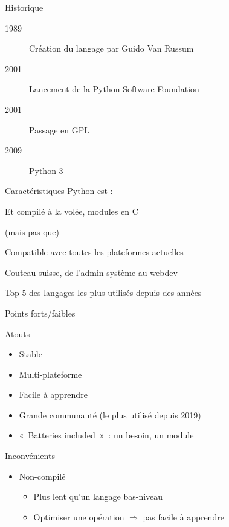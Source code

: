 \begin{frame}{Historique}
  \begin{description}
  \item[1989] Création du langage par Guido Van Russum
  \item[2001] Lancement de la Python Software Foundation
  \item[2001] Passage en GPL
  \item[2009] Python 3
  \end{description}
\end{frame}

\begin{frame}{Caractéristiques}
  Python est :
  \begin{description}[<+(1)->]
  \item[Interprété] Et compilé à la volée, modules en C
  \item[Orienté objet] (mais pas que)
  \item[Portable] Compatible  avec toutes les plateformes actuelles
  \item[Flexible] Couteau suisse, de l'admin système au webdev
  \item[Populaire] Top 5 des langages les plus utilisés depuis des années
  \end{description}
\end{frame}

\begin{frame}{Points forts/faibles}
  \begin{minipage}[l]{0.49\linewidth}
    Atouts
    \begin{itemize}
    \item Stable
    \item Multi-plateforme
    \item Facile à apprendre
    \item Grande communauté (le plus utilisé depuis 2019)
    \item « Batteries included » : un besoin, un module
    \end{itemize}
  \end{minipage}\hfill
  \begin{minipage}[l]{0.49\linewidth}
    Inconvénients
    \begin{itemize}
    \item Non-compilé
      \begin{itemize}
      \item Plus lent qu'un langage bas-niveau
      \item Optimiser une opération $\Rightarrow$ pas facile à apprendre
      \end{itemize}
    \end{itemize}
  \end{minipage}\hfill
\end{frame}

